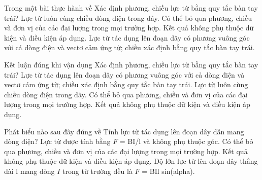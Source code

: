 \begin{ex}
Trong một bài thực hành về Xác định phương, chiều lực từ bằng quy tắc bàn tay trái?
\choice
{Lực từ luôn cùng chiều dòng điện trong dây.}
{Có thể bỏ qua phương, chiều và đơn vị của các đại lượng trong mọi trường hợp.}
{Kết quả không phụ thuộc dữ kiện và điều kiện áp dụng.}
{\True Lực từ tác dụng lên đoạn dây có phương vuông góc với cả dòng điện và vectơ cảm ứng từ; chiều xác định bằng quy tắc bàn tay trái.}
\end{ex}

\begin{ex}
Kết luận đúng khi vận dụng Xác định phương, chiều lực từ bằng quy tắc bàn tay trái?
\choice
{\True Lực từ tác dụng lên đoạn dây có phương vuông góc với cả dòng điện và vectơ cảm ứng từ; chiều xác định bằng quy tắc bàn tay trái.}
{Lực từ luôn cùng chiều dòng điện trong dây.}
{Có thể bỏ qua phương, chiều và đơn vị của các đại lượng trong mọi trường hợp.}
{Kết quả không phụ thuộc dữ kiện và điều kiện áp dụng.}
\end{ex}

\begin{ex}
Phát biểu nào sau đây đúng về Tính lực từ tác dụng lên đoạn dây dẫn mang dòng điện?
\choice
{Lực từ được tính bằng $F$ = BI/l và không phụ thuộc góc.}
{Có thể bỏ qua phương, chiều và đơn vị của các đại lượng trong mọi trường hợp.}
{Kết quả không phụ thuộc dữ kiện và điều kiện áp dụng.}
{\True Độ lớn lực từ lên đoạn dây thẳng dài l mang dòng $I$ trong từ trường đều là $F$ = BIl sin(alpha).}
\end{ex}

